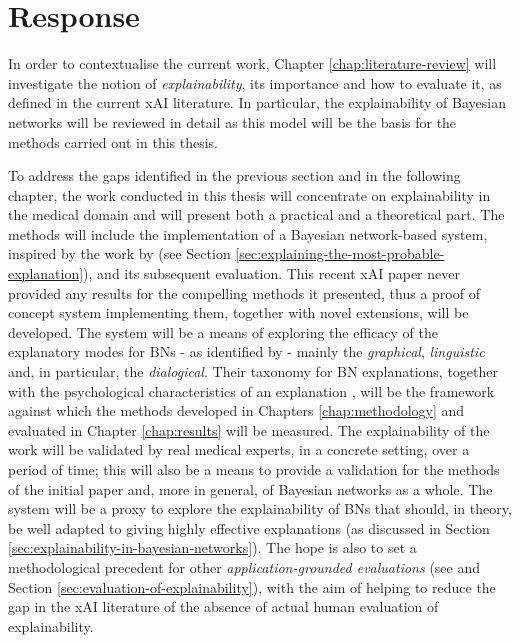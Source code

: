 \section{Response} \label{sec:response}
In order to contextualise the current work, Chapter \ref{chap:literature-review} will investigate the notion of \textit{explainability}, its importance and how to evaluate it, as defined in the current xAI literature.
In particular, the explainability of Bayesian networks will be reviewed in detail as this model will be the basis for the methods carried out in this thesis.

To address the gaps identified in the previous section and in the following chapter, the work conducted in this thesis will concentrate on explainability in the medical domain and will present both a practical and a theoretical part.
The methods will include the implementation of a Bayesian network-based system, inspired by the work by \citet{Butz2018} (see Section \ref{sec:explaining-the-most-probable-explanation}), and its subsequent evaluation.
This recent xAI paper never provided any results for the compelling methods it presented, thus a proof of concept system implementing them, together with novel extensions, will be developed.
The system will be a means of exploring the efficacy of the explanatory modes for BNs - as identified by \citet{lacave2002review} - mainly the \textit{graphical}, \textit{linguistic} and, in particular, the \textit{dialogical}.
Their taxonomy for BN explanations, together with the psychological characteristics of an explanation \citep{miller2018explanation}, will be the framework against which the methods developed in Chapters \ref{chap:methodology} and evaluated in Chapter \ref{chap:results} will be measured.
The explainability of the work will be validated by real medical experts, in a concrete setting, over a period of time; this will also be a means to provide a validation for the methods of the initial paper \citep{Butz2018} and, more in general, of Bayesian networks as a whole.
The system will be a proxy to explore the explainability of BNs that should, in theory, be well adapted to giving highly effective explanations (as discussed in Section \ref{sec:explainability-in-bayesian-networks}).
The hope is also to set a methodological precedent for other \textit{application-grounded evaluations} (see \citep{doshi2017towards} and Section \ref{sec:evaluation-of-explainability}), with the aim of helping to reduce the gap in the xAI literature of the absence of actual human evaluation of explainability.

